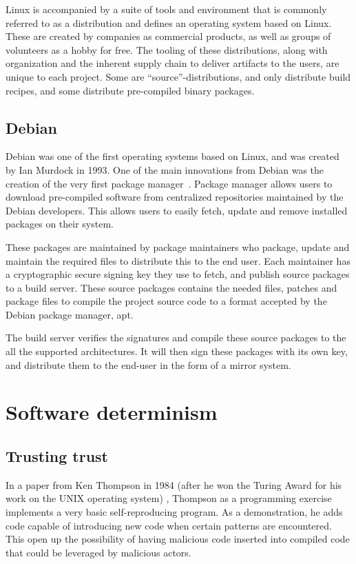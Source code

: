 \documentclass[../Main/thesis.tex]{subfiles}
\begin{document}
Linux is accompanied by a suite of tools and environment that is commonly
referred to as a distribution and defines an operating system based on
Linux. These are created by companies as commercial products, as well as groups
of volunteers as a hobby for free. The tooling of these distributions, along
with organization and the inherent supply chain to deliver artifacts to the
users, are unique to each project. Some are ``source''-distributions, and only
distribute build recipes, and some distribute pre-compiled binary packages.

\subsection*{Debian}
Debian was one of the first operating systems based on Linux, and was created by
Ian Murdock in 1993. One of the main innovations from Debian was the creation of
the very first package manager~\cite{debian-history}. Package manager allows
users to download pre-compiled software from centralized repositories maintained
by the Debian developers. This allows users to easily fetch, update and remove
installed packages on their system.

These packages are maintained by package maintainers who package, update and
maintain the required files to distribute this to the end user. Each maintainer
has a cryptographic secure signing key they use to fetch, and publish source
packages to a build server. These source packages contains the needed files,
patches and package files to compile the project source code to a format
accepted by the Debian package manager, apt.

The build server verifies the signatures and compile these source packages to
the all the supported architectures. It will then sign these packages with its
own key, and distribute them to the end-user in the form of a mirror system.


\section{Software determinism}\label{sec:reproducible_builds}


\subsection*{Trusting trust}
In a paper from Ken Thompson in 1984 (after he won the Turing Award for his work
on the UNIX operating system) ,
Thompson as a programming exercise implements a very basic self-reproducing
program. As a demonstration, he adds code capable of introducing new code when
certain patterns are encountered. This open up the possibility of having
malicious code inserted into compiled code that could be leveraged by malicious
actors.
\end{document}
